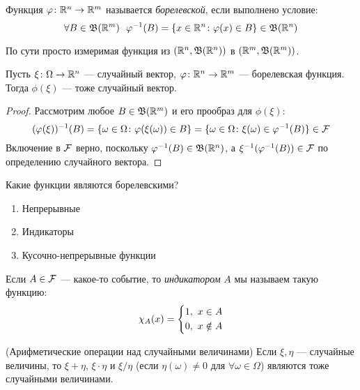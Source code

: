 \begin{definition}
	Функция $\varphi \colon \mathbb{R}^n \to \mathbb{R}^m$ называется \textit{борелевской}, если выполнено условие:
	\[
		\forall B \in \mathfrak{B}(\mathbb{R}^m)\ \ \varphi^{-1}(B) = \{x \in \mathbb{R}^n \colon \varphi(x) \in B\} \in \mathfrak{B}(\mathbb{R}^n)
	\]
\end{definition}

\begin{anote}
	По сути просто измеримая функция из $(\mathbb{R}^n, \mathfrak{B}(\mathbb{R}^n))$ в $(\mathbb{R}^m, \mathfrak{B}(\mathbb{R}^m))$.
\end{anote}

\begin{proposition}
	Пусть $\xi \colon \Omega \to \mathbb{R}^n$ --- случайный вектор, $\varphi \colon \mathbb{R}^n \to \mathbb{R}^m$ --- борелевская функция. Тогда $\phi(\xi)$ --- тоже случайный вектор.
\end{proposition}

\begin{proof}
	Рассмотрим любое $B \in \mathfrak{B}(\mathbb{R}^m)$ и его прообраз для $\phi(\xi)$:
	\[
		(\varphi(\xi))^{-1}(B) = \{\omega \in \Omega \colon \varphi(\xi(\omega)) \in B\} = \{\omega \in \Omega \colon \xi(\omega) \in \varphi^{-1}(B)\} \in \mathcal{F}
	\]
	Включение в $\mathcal{F}$ верно, поскольку $\varphi^{-1}(B) \in \mathfrak{B}(\mathbb{R}^n)$, а $\xi^{-1}(\varphi^{-1}(B)) \in \mathcal{F}$ по определению случайного вектора.
\end{proof}

\begin{note}
	Какие функции являются борелевскими?
	\begin{enumerate}
		\item Непрерывные
		
		\item Индикаторы
		
		\item Кусочно-непрерывные функции
	\end{enumerate}
\end{note}

\begin{reminder}
	Если $A \in \mathcal{F}$ --- какое-то событие, то \textit{индикатором} $A$ мы называем такую функцию:
	\[
		\chi_A(x) = \left\{\begin{aligned}
			&{1,\ x \in A}
			\\
			&{0,\ x \notin A}
		\end{aligned}\right.
	\]
\end{reminder}

\begin{corollary} (Арифметические операции над случайными величинами)
	Если $\xi, \eta$ --- случайные величины, то $\xi + \eta$, $\xi \cdot \eta$ и $\xi / \eta$ (если $\eta(\omega) \neq 0$ для $\forall \omega \in \Omega$) являются тоже случайными величинами.
\end{corollary}

